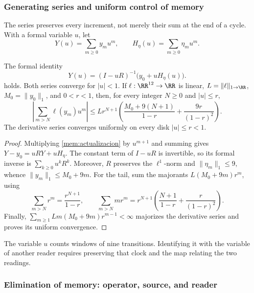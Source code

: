 \subsubsection{Generating series and uniform control of memory}

The series preserves every increment, not merely their sum at the end
of a cycle. With a formal variable \(u\), let
\[
 Y(u)=\sum_{m\geq0}y_mu^m,\qquad
 H_\eta(u)=\sum_{m\geq0}\eta_mu^m.
\]

\begin{proposition}
\label{mem:prop-serie}
The formal identity
\begin{equation}
 Y(u)=(I-uR)^{-1}\bigl(y_0+uH_\eta(u)\bigr).
 \label{mem:serie}
\end{equation}
holds. Both series converge for \(|u|<1\). If \(\ell:\RR^{12}\to\RR\)
is linear, \(L=\|\ell\|_{1\to\RR}\), \(M_0=\|y_0\|_1\), and
\(0<r<1\), then, for every integer \(N\geq0\) and \(|u|\leq r\),
\begin{equation}
 \left|\sum_{m>N}\ell(y_m)u^m\right|
 \leq Lr^{N+1}\left(
 \frac{M_0+9(N+1)}{1-r}+\frac{9r}{(1-r)^2}\right).
 \label{mem:cota}
\end{equation}
The derivative series converges uniformly on every disk
\(|u|\leq r<1\).
\end{proposition}
\begin{proof}
Multiplying \eqref{mem:actualizacion} by \(u^{m+1}\) and summing gives
\(Y-y_0=uRY+uH_\eta\). The constant term of \(I-uR\) is
invertible, so its formal inverse is \(\sum_{k\geq0}u^kR^k\).
Moreover, \(R\) preserves the \(\ell^1\)-norm and
\(\|\eta_m\|_1\leq9\), whence
\(\|y_m\|_1\leq M_0+9m\).
For the tail, sum the majorants
\(L(M_0+9m)r^m\), using
\[
 \sum_{m>N}r^m=\frac{r^{N+1}}{1-r},\qquad
 \sum_{m>N}mr^m=r^{N+1}
 \left(\frac{N+1}{1-r}+\frac r{(1-r)^2}\right).
\]
Finally, \(\sum_{m\geq1}Lm(M_0+9m)r^{m-1}<\infty\)
majorizes the derivative series and proves its uniform convergence.
\end{proof}

The variable \(u\) counts windows of nine transitions. Identifying it
with the variable of another reader requires preserving that clock and the map
relating the two readings.

\subsubsection{Elimination of memory: operator, source, and reader}

